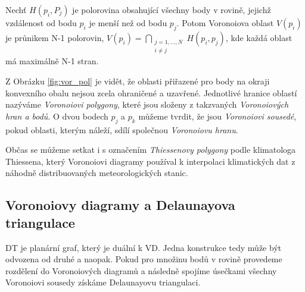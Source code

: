 \documentclass[12pt,a4paper]{article}
\begin{document}
Nechť $H(p_i,P_j)$ je polorovina obsahující všechny body v rovině, jejichž vzdálenost od bodu $p_i$ je menší než od bodu $p_j$. Potom Voronoiova oblast $V(p_i)$ je průnikem N-1 polorovin,
$V(p_i)= \bigcap\limits_{\substack{j=1,...,N \\ i\not=j}}H(p_i,p_j)$, kde každá oblast má maximálně N-1 stran.

Z Obrázku \ref{fig:vor_pol} je vidět, že oblasti přiřazené pro body na okraji konvexního obalu nejsou zcela ohraničené a uzavřené. Jednotlivé hranice oblastí nazýváme \textit{Voronoiovi polygony}, které jsou složeny z takzvaných \textit{Voronoiových hran a bodů}. O dvou bodech $p_j$ a $p_k$ můžeme tvrdit, že jsou \textit{Voronoiovi sousedé}, pokud oblasti, kterým náleží, sdílí společnou \textit{Voronoiovu hranu}. 

Občas se můžeme setkat i s označením \textit{Thiessenovy polygony} podle klimatologa Thiessena, který Voronoiovi diagramy používal k interpolaci klimatických dat z náhodně distribuovaných meteorologických stanic.

\newpage
\subsection{Voronoiovy diagramy a Delaunayova triangulace}

DT je planární graf, který je duální k VD. Jedna konstrukce tedy může být odvozena od druhé a naopak. 
Pokud pro množinu bodů v rovině provedeme rozdělení do Voronoiových diagramů a následně spojíme úsečkami všechny Voronoiovi sousedy získáme Delaunayovu triangulaci.
\end{document}
